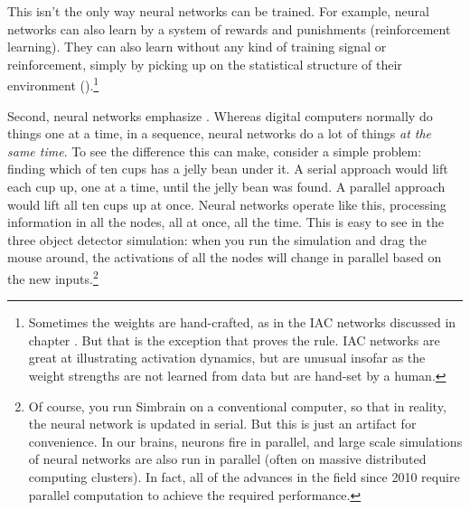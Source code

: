 
This isn't the only way neural networks can be trained. For example, neural networks can also learn by a system of rewards and punishments (reinforcement learning). They can also learn without any kind of training signal or reinforcement, simply by picking up on the statistical structure of their environment ().\footnote{Sometimes the weights are hand-crafted, as in the IAC networks discussed in chapter . But that is the exception that proves the rule. IAC networks are great at illustrating activation dynamics, but are unusual insofar as the weight strengths are not learned from data but are hand-set by a human.}

Second, neural networks emphasize . Whereas digital computers normally do things one at a time, in a sequence, neural networks do a lot of things  \emph{at the same time}. To see the difference this can make, consider a simple problem: finding which of ten cups has a jelly bean under it. A serial approach would lift each cup up, one at a time, until the jelly bean was found. A parallel approach would lift all ten cups up at once. Neural networks operate like this, processing information in all the nodes, all at once, all the time. This is easy to see  in the three object detector simulation: when you run the simulation and drag the mouse around, the activations of all the nodes will change in parallel based on the new inputs.\footnote{Of course, you run Simbrain on a conventional computer, so that in reality, the neural network is updated in serial. But this is just an artifact for convenience. In our brains, neurons fire in parallel, and large scale simulations of neural networks are also run in parallel (often on massive distributed computing clusters). In fact, all of the advances in the field since 2010 require parallel computation to achieve the required performance.} 

